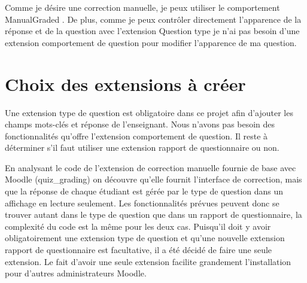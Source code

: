 Comme je désire une correction manuelle, je peux utiliser le comportement \og ManualGraded \fg{}.
De plus, comme je peux contrôler directement l'apparence de la réponse et de la question avec l'extension \og Question type \fg{} je n'ai pas besoin d'une extension comportement de question pour modifier l'apparence de ma question.

\section{Choix des extensions à créer}

Une extension type de question est obligatoire dans ce projet afin d'ajouter les champs mots-clés et réponse de l'enseignant.
Nous n'avons pas besoin des fonctionnalités qu'offre l'extension comportement de question.
Il reste à déterminer s'il faut utiliser une extension rapport de questionnaire ou non.

En analysant le code de l'extension de correction manuelle fournie de base avec Moodle (quiz\_grading) on découvre qu'elle fournit l'interface de correction, mais que la réponse de chaque étudiant est gérée par le type de question dans un affichage en lecture seulement.
Les fonctionnalités prévues peuvent donc se trouver autant dans le type de question que dans un rapport de questionnaire, la complexité du code est la même pour les deux cas.
Puisqu'il doit y avoir obligatoirement une extension type de question et qu'une nouvelle extension rapport de questionnaire est facultative, il a été décidé de faire une seule extension.
Le fait d'avoir une seule extension facilite grandement l'installation pour d'autres administrateurs Moodle.